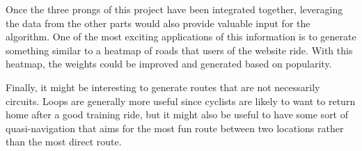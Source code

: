 \documentclass[twocolumn,11pt]{article}
\begin{document}
Once the three prongs of this project have been integrated together, leveraging
the data from the other parts would also provide valuable input for the
algorithm. One of the most exciting applications of this information is to
generate something similar to a heatmap of roads that users of the website
ride. With this heatmap, the weights could be improved and generated based on
popularity.

Finally, it might be interesting to generate routes that are not necessarily
circuits. Loops are generally more useful since cyclists are likely to want
to return home after a good training ride, but it might also be useful to
have some sort of quasi-navigation that aims for the most fun route
between two locations rather than the most direct route.
\end{document}

